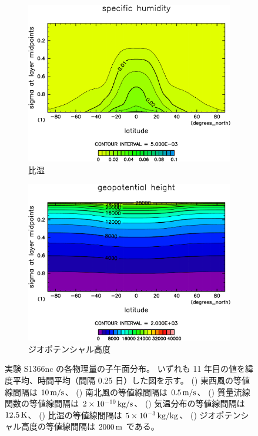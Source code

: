 \documentclass[body]{subfiles}
\begin{document}
\begin{figure}[t]
\begin{subfigure}{.4\textwidth}
		\includegraphics[width=\columnwidth]{S1366-nc/QH2OVap,time=3650:4015-crop-rotate.pdf}
		\caption{比湿\hmu*{[kg/kg]}}\label{S1366nc比湿}
	\end{subfigure}
	\begin{subfigure}{.4\textwidth}
		\centering
		\includegraphics[width=\columnwidth]{S1366-nc/Height,time=3650:4015-crop-rotate.pdf}
		\caption{ジオポテンシャル高度\hmu*{[m/s]}}\label{S1366ncジオポテンシャル高度}
	\end{subfigure}
	\caption[実験 S1366nc の各物理量の子午面分布]{
		実験 S1366nc の各物理量の子午面分布。
		いずれも 11 年目の値を緯度平均、時間平均（間隔 0.25 日）した図を示す。
		() 東西風の等値線間隔は \(10\hmu{m/s}\)、
		() 南北風の等値線間隔は \(0.5\hmu{m/s}\)、
		() 質量流線関数の等値線間隔は \(2\hme{-10}\hmu{kg/s}\)、
		() 気温分布の等値線間隔は \(12.5\hmu{K}\)、
		() 比湿の等値線間隔は \(5\hme{-3}\hmu{kg/kg}\)、
		() ジオポテンシャル高度の等値線間隔は \(2000\hmu{m}\) である。
	}\label{S1366nc}
\end{figure}
\end{document}
